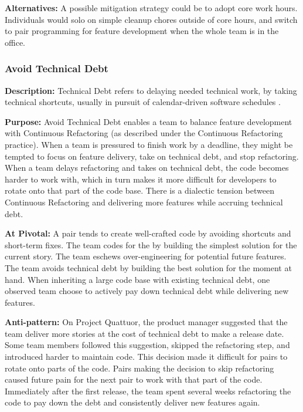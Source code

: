 \textbf{Alternatives:} A possible mitigation strategy could be to adopt core work hours. Individuals would solo on simple cleanup chores outside of core hours, and switch to pair programming for feature development when the whole team is in the office. 

\subsubsection{Avoid Technical Debt}
\textbf{Description:} Technical Debt refers to delaying needed technical work, by taking technical shortcuts, usually in pursuit of calendar-driven software schedules \cite{McConnellTechnicalDebt}. 

\textbf{Purpose:} Avoid Technical Debt enables a team to balance feature development with Continuous Refactoring (as described under the Continuous Refactoring practice). When a team is pressured to finish work by a deadline, they might be tempted to focus on feature delivery, take on technical debt, and stop refactoring. When a team delays refactoring and takes on technical debt, the code becomes harder to work with, which in turn makes it more difficult for developers to rotate onto that part of the code base. There is a dialectic tension \cite{RalphProcessTheories} between Continuous Refactoring and delivering more features while accruing technical debt.

\textbf{At Pivotal:} A pair tends to create well-crafted code by avoiding shortcuts and short-term fixes. The team codes for the  by building the simplest solution for the current story. The team eschews over-engineering for potential future features. The team avoids technical debt by building the best solution for the moment at hand. When inheriting a large code base with existing technical debt, one observed team choose to actively pay down technical debt while delivering new features. 

\textbf{Anti-pattern:} On Project Quattuor, the product manager suggested that the team deliver more stories at the cost of technical debt to make a release date. Some team members followed this suggestion, skipped the refactoring step, and introduced harder to maintain code. This decision made it difficult for pairs to rotate onto parts of the code. Pairs making the decision to skip refactoring caused future pain for the next pair to work with that part of the code. Immediately after the first release, the team spent several weeks refactoring the code to pay down the debt and consistently deliver new features again.
